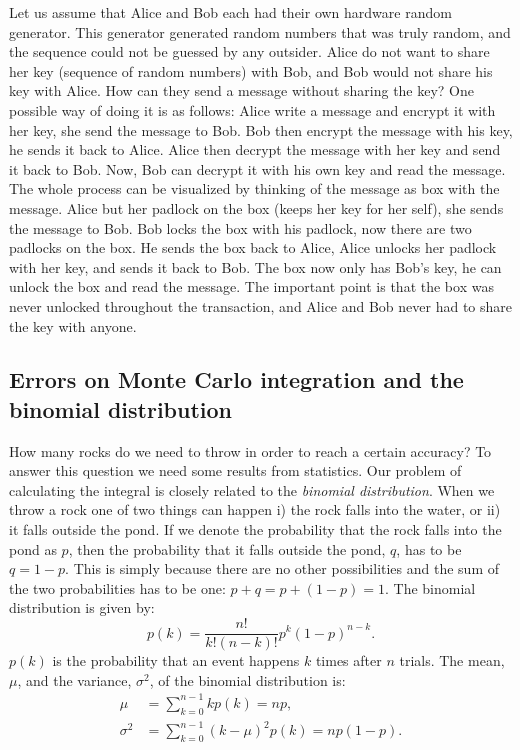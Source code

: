 \documentclass[graybox,sectrefs,envcountresetchap,open=right,final]{svmonodo}
\begin{document}
Let us assume that Alice and Bob each had their own
hardware random generator. This generator generated random numbers that was truly
random, and the sequence could not be guessed by any outsider. Alice
do not want to share her key (sequence of random numbers) with Bob,
and Bob would not share his key with Alice. How can they send a
message without sharing the key? One possible way of doing it is as
follows: Alice write a message and encrypt it with her key, she send
the message to Bob. Bob then encrypt the message with his key, he
sends it back to Alice. Alice then decrypt the message with her key
and send it back to Bob. Now, Bob can decrypt it with his own key and
read the message. The whole process can be visualized by thinking of
the message as box with the message. Alice but her padlock on the box
(keeps her key for her self), she sends the message to Bob. Bob locks
the box with his padlock, now there are two padlocks on the box. He
sends the box back to Alice, Alice unlocks her padlock with her key,
and sends it back to Bob. The box now only has Bob's key, he can
unlock the box and read the message. The important point is that the
box was never unlocked throughout the transaction, and Alice and Bob
never had to share the key with anyone. 

\subsection{Errors on Monte Carlo integration and the binomial distribution}
How many rocks do we need to throw in order to reach a certain accuracy? To answer this question we need some results from statistics. Our problem of calculating the integral is closely related to the \emph{binomial distribution}. When we throw a rock one of two things can happen i) the rock falls into the water, or ii) it falls outside the pond. If we denote the probability that the rock falls into the pond as $p$, then the probability that it falls outside the pond, $q$, has to be $q=1-p$.
This is simply because there are no other possibilities and the sum of the two probabilities has to be one: $p+q=p+(1-p)=1$. The binomial distribution is given by:
\begin{equation}
p(k)=\frac{n!}{k!(n-k)!}p^k(1-p)^{n-k}.
\label{eq:mc:bin}
\end{equation}
$p(k)$ is the probability that an event happens $k$ times after $n$ trials. The mean, $\mu$, and the variance, $\sigma^2$, of the binomial distribution is:
\begin{align}
\mu&=\sum_{k=0}^{n-1}kp(k)=np, \label{eq:mc:binm}\\ 
\sigma^2&=\sum_{k=0}^{n-1}(k-\mu)^2p(k)=np(1-p). \label{eq:mc:bins}
\end{align}
\end{document}
